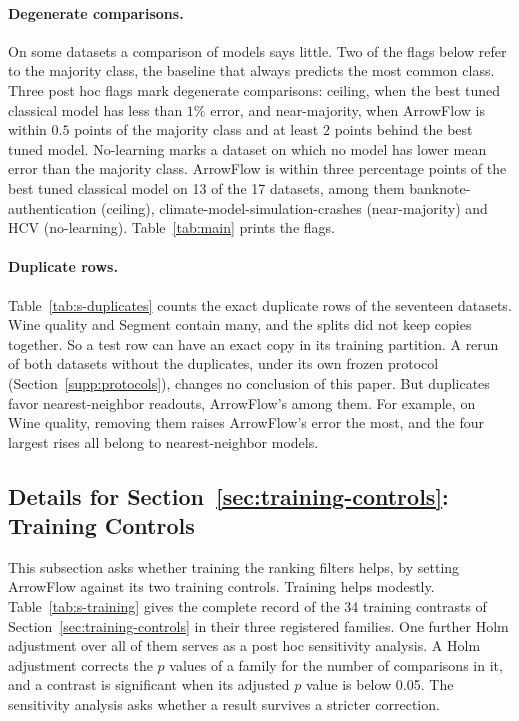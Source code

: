 \paragraph{Degenerate comparisons.} On some datasets a comparison of models says little. Two of the flags below refer to the majority class, the baseline that always predicts the most common class. Three post hoc flags mark degenerate comparisons: ceiling, when the best tuned classical model has less than $1\%$ error, and near-majority, when ArrowFlow is within $0.5$ points of the majority class and at least $2$ points behind the best tuned model. No-learning marks a dataset on which no model has lower mean error than the majority class. ArrowFlow is within three percentage points of the best tuned classical model on 13 of the 17 datasets, among them banknote-authentication (ceiling), climate-model-simulation-crashes (near-majority) and HCV (no-learning). Table~\ref{tab:main} prints the flags.

\paragraph{Duplicate rows.} Table~\ref{tab:s-duplicates} counts the exact duplicate rows of the seventeen datasets. Wine quality and Segment contain many, and the splits did not keep copies together. So a test row can have an exact copy in its training partition. A rerun of both datasets without the duplicates, under its own frozen protocol (Section~\ref{supp:protocols}), changes no conclusion of this paper. But duplicates favor nearest-neighbor readouts, ArrowFlow's among them. For example, on Wine quality, removing them raises ArrowFlow's error the most, and the four largest rises all belong to nearest-neighbor models.



\FloatBarrier
\subsection{Details for Section~\ref*{sec:training-controls}: Training Controls}\label{supp:training}

This subsection asks whether training the ranking filters helps, by setting ArrowFlow against its two training controls. Training helps modestly. Table~\ref{tab:s-training} gives the complete record of the 34 training contrasts of Section~\ref{sec:training-controls} in their three registered families. One further Holm adjustment over all of them serves as a post hoc sensitivity analysis. A Holm adjustment corrects the $p$ values of a family for the number of comparisons in it, and a contrast is significant when its adjusted $p$ value is below 0.05. The sensitivity analysis asks whether a result survives a stricter correction.

